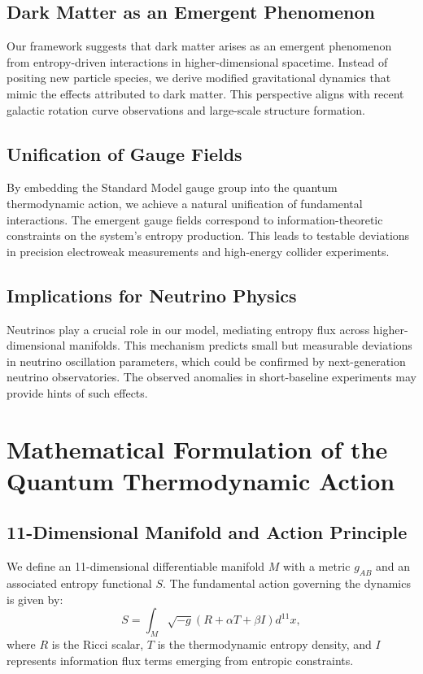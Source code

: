 \documentclass[12pt]{article}
\begin{document}
\subsection{Dark Matter as an Emergent Phenomenon}
Our framework suggests that dark matter arises as an emergent phenomenon from entropy-driven interactions in higher-dimensional spacetime. Instead of positing new particle species, we derive modified gravitational dynamics that mimic the effects attributed to dark matter. This perspective aligns with recent galactic rotation curve observations and large-scale structure formation.

\subsection{Unification of Gauge Fields}
By embedding the Standard Model gauge group into the quantum thermodynamic action, we achieve a natural unification of fundamental interactions. The emergent gauge fields correspond to information-theoretic constraints on the system’s entropy production. This leads to testable deviations in precision electroweak measurements and high-energy collider experiments.

\subsection{Implications for Neutrino Physics}
Neutrinos play a crucial role in our model, mediating entropy flux across higher-dimensional manifolds. This mechanism predicts small but measurable deviations in neutrino oscillation parameters, which could be confirmed by next-generation neutrino observatories. The observed anomalies in short-baseline experiments may provide hints of such effects.

\section{Mathematical Formulation of the Quantum Thermodynamic Action}
\subsection{11-Dimensional Manifold and Action Principle}
We define an 11-dimensional differentiable manifold $M$ with a metric $g_{AB}$ and an associated entropy functional $S$. The fundamental action governing the dynamics is given by:
\begin{equation}
S = \int_M \sqrt{-g} \left(R + \alpha T + \beta I\right) d^{11}x,
\end{equation}
where $R$ is the Ricci scalar, $T$ is the thermodynamic entropy density, and $I$ represents information flux terms emerging from entropic constraints.
\end{document}

